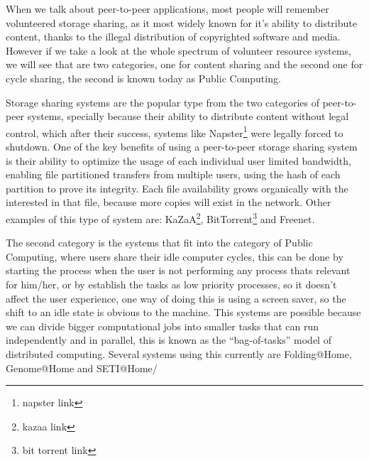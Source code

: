 When we talk about peer-to-peer applications, most people will remember volunteered storage sharing, as it most widely known for it's ability to distribute content, thanks to the illegal distribution of copyrighted software and media. However if we take a look at the whole spectrum of volunteer resource systems, we will see that are two categories, one for content sharing and the second one for cycle sharing, the second is known today as Public Computing.

Storage sharing systems are the popular type from the two categories of peer-to-peer systems, specially because their ability to distribute content without legal control, which after their success, systems like Napster\footnote{napster link} were legally forced to shutdown. One of the key benefits of using a peer-to-peer storage sharing system is their ability to optimize the usage of each individual user limited bandwidth, enabling file partitioned transfers from multiple users, using the hash of each partition to prove its integrity. Each file availability grows organically with the interested in that file, because more copies will exist in the network. Other examples of this type of system are: KaZaA\footnote{kazaa link}, BitTorrent\footnote{bit torrent link} and Freenet\cite{Clarke2001}.

The second category is the systems that fit into the category of Public Computing, where users share their idle computer cycles, this can be done by starting the process when the user is not performing any process thats relevant for him/her, or by establish the tasks as low priority processes, so it doesn't affect the user experience, one way of doing this is using a screen saver, so the shift to an idle state is obvious to the machine. This systems are possible because we can divide bigger computational jobs into smaller tasks that can run independently and in parallel, this is known as the ``bag-of-tasks'' model of distributed computing. Several systems using this currently are Folding@Home, Genome@Home\cite{Larson2002} and SETI@Home\cite{Anderson2002}\cite{Korpela2001}/

